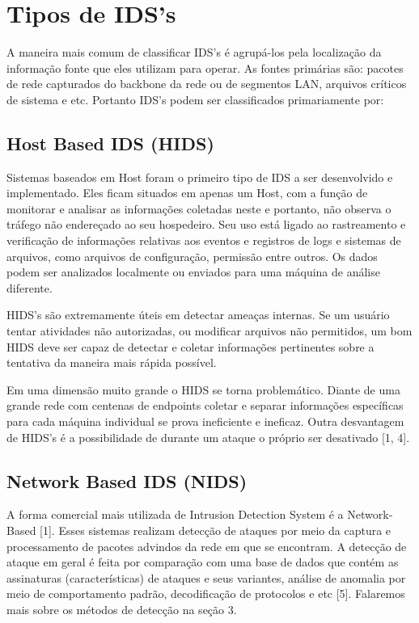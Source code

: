 \documentclass[conference]{IEEEtran}
\begin{document}
\section{Tipos de IDS's}
A maneira mais comum de classificar IDS's é agrupá-los pela localização da informação
fonte que eles utilizam para operar. As fontes primárias são: pacotes de rede capturados do backbone da rede ou de segmentos LAN, arquivos críticos de sistema e etc. Portanto IDS's podem ser classificados primariamente por:
\subsection{Host Based IDS (HIDS)}

Sistemas baseados em Host foram o primeiro tipo de IDS a ser desenvolvido e implementado. Eles ficam situados em apenas um Host, com a função de monitorar e analisar as informações coletadas neste e portanto, não observa o tráfego não endereçado ao seu hospedeiro. Seu uso está ligado ao rastreamento e verificação de informações relativas aos eventos e registros de logs e sistemas de arquivos, como arquivos de configuração, permissão entre outros. Os dados podem ser analizados localmente ou enviados para uma máquina de análise diferente.

HIDS's são extremamente úteis em detectar ameaças internas. Se um usuário tentar atividades não autorizadas, ou modificar arquivos não permitidos, um bom HIDS deve ser capaz de detectar e coletar informações pertinentes sobre a tentativa da maneira mais rápida possível.

Em uma dimensão muito grande o HIDS se torna problemático. Diante de uma grande rede com centenas de endpoints coletar e separar informações específicas para cada máquina individual se prova ineficiente e ineficaz. Outra desvantagem de HIDS's é a possibilidade de durante um ataque o próprio ser desativado [1, 4]. 

\subsection{Network Based IDS (NIDS)}
A forma comercial mais utilizada de Intrusion Detection System é a Network-Based [1]. Esses sistemas realizam detecção de ataques por meio da captura e processamento de pacotes advindos da rede em que se encontram. A detecção de ataque em geral é feita por comparação com uma base de dados que contém as assinaturas (características) de ataques e seus variantes, análise de anomalia por meio de comportamento padrão, decodificação de protocolos e etc  [5]. Falaremos mais sobre os métodos de detecção na seção 3.
\end{document}

